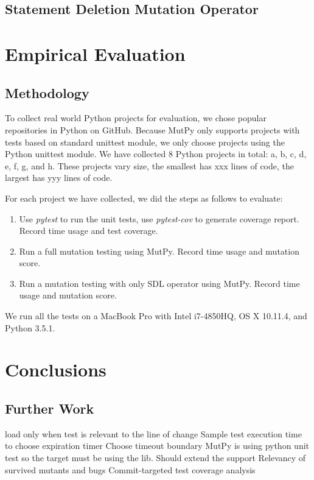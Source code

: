 \documentclass[12pt]{article}
\begin{document}
\subsection{Statement Deletion Mutation Operator}

\section{Empirical Evaluation}

\subsection{Methodology}

To collect real world Python projects for evaluation, we chose popular repositories in Python on GitHub. Because MutPy only supports projects with tests based on standard unittest module, we only choose projects using the Python unittest module. We have collected 8 Python projects in total: a, b, c, d, e, f, g, and h. These projects vary size, the smallest has xxx lines of code, the largest has yyy lines of code.

For each project we have collected, we did the steps as follows to evaluate:

\begin{enumerate}
  \item Use \emph{pytest} \cite{pytest} to run the unit tests, use \emph{pytest-cov} \cite{pytest-cov} to generate coverage report. Record time usage and test coverage.
  \item Run a full mutation testing using MutPy. Record time usage and mutation score.
  \item Run a mutation testing with only SDL operator using MutPy. Record time usage and mutation score.
\end{enumerate}

We run all the tests on a MacBook Pro with Intel i7-4850HQ, OS X 10.11.4, and Python 3.5.1.

\section{Conclusions}

\subsection{Further Work}

load only when test is relevant to the line of change
Sample test execution time to choose expiration timer
Choose timeout boundary
MutPy is using python unit test so the target must be using the lib. Should extend the support 
Relevancy of survived mutants and bugs
Commit-targeted test coverage analysis

\begin{appendices}
\end{appendices}



\end{document}
